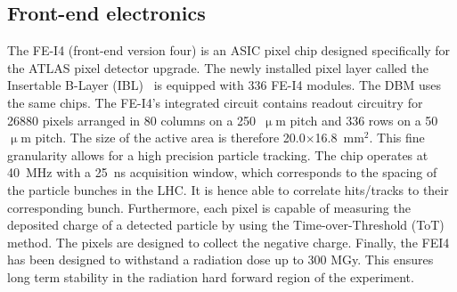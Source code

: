 \documentclass[12pt]{packages/mytustyle}  %
\begin{document}
\subsection{Front-end electronics}
The FE-I4 (front-end version four) is an ASIC pixel chip designed specifically for the ATLAS pixel detector upgrade. The newly installed pixel layer called the Insertable B-Layer (IBL)~\cite{} is equipped with 336 FE-I4 modules. The DBM uses the same chips. The FE-I4's integrated circuit contains readout circuitry for 26880 pixels arranged in 80 columns on a 250~$\upmu$m pitch and 336 rows on a 50~$\upmu$m pitch. The size of the active area is therefore 20.0$\times$16.8~mm$^2$. This fine granularity allows for a high precision particle tracking. The chip operates at 40~MHz with a 25~ns acquisition window, which corresponds to the spacing of the particle bunches in the LHC. It is hence able to correlate hits/tracks to their corresponding bunch. Furthermore, each pixel is capable of measuring the deposited charge of a detected particle by using the Time-over-Threshold (ToT) method. The pixels are designed to collect the negative charge. Finally, the FEI4 has been designed to withstand a radiation dose up to 300 MGy. This ensures long term stability in the radiation hard forward region of the experiment.
\end{document}

